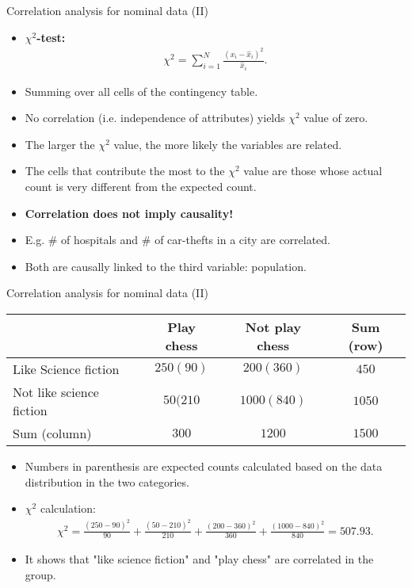 \documentclass[aspectratio=169,t]{beamer}
\begin{document}
  { 
    \begin{frame}{Correlation analysis for nominal data (II)}
      \begin{itemize}
        \item \textbf{\color{airforceblue}$\chi^2$-test:}
        \begin{align}
          \chi^2 = \sum_{i=1}^{N} \frac{(x_i-\hat{x}_i)^2}{\hat{x}_i}.
        \end{align}
        \item Summing over all cells of the contingency table.
        \item No correlation (i.e. independence of attributes) yields $\chi^2$ value of zero.
        \item The larger the $\chi^2$ value, the more likely the variables are related.
        \item The cells that contribute the most to the $\chi^2$ value
are those whose actual count is very different from the expected count.
      \end{itemize}
      \begin{itemize}
        \item \textbf{Correlation does not imply causality!}
        \item E.g. $\#$ of hospitals and $\#$ of car-thefts in a city are correlated.
        \item Both are causally linked to the third variable: population.
      \end{itemize}
    \end{frame}
  }

  { 
    \begin{frame}{Correlation analysis for nominal data (II)}
    \centering
    \begin{tabular}{l|c|c|c|}
    & Play chess & Not play chess & Sum (row)\\\hline
    Like Science fiction & $250 (90)$ & $200 (360)$ & $450$ \\\hline
    Not like science fiction & $50 (210$ & $1000 (840)$ & $1050$\\\hline
    Sum (column) & $300$ & $1200$ & $1500$\\\hline
    \end{tabular}
    \begin{itemize}
      \item Numbers in parenthesis are expected counts calculated based on the data distribution in the two categories.
      \item $\chi^2$ calculation:
      \begin{align}
      \chi^2 = \frac{(250-90)^2}{90} + \frac{(50-210)^2}{210} + \frac{(200-360)^2}{360} + \frac{(1000-840)^2}{840} = 507.93.
      \end{align}
      \item It shows that "like science fiction" and "play chess" are correlated in the group.
    \end{itemize}
    \end{frame}
  }
\end{document}
